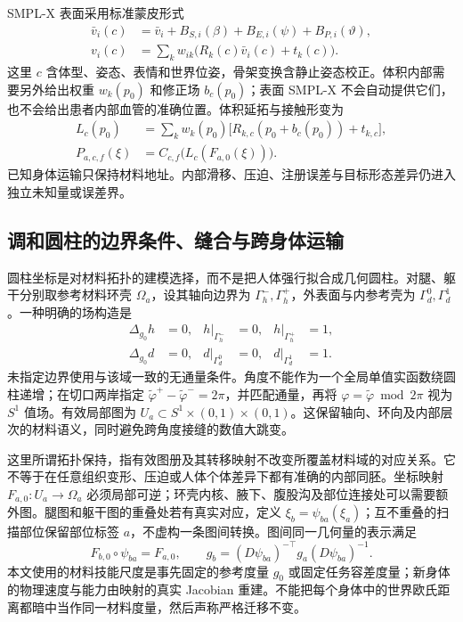 \documentclass[11pt,a4paper]{article}
\numberwithin{equation}{section}
\theoremstyle{definition}
\begin{document}
SMPL-X 表面采用标准蒙皮形式\cite{pavlakos2019}
\begin{align}
 \bar v_i(c)&=\bar v_i+B_{S,i}(\beta)+B_{E,i}(\psi)+B_{P,i}(\vartheta),\\
 v_i(c)&=\sum_k w_{ik}\bigl(R_k(c)\bar v_i(c)+t_k(c)\bigr).
\end{align}
这里 $c$ 含体型、姿态、表情和世界位姿，骨架变换含静止姿态校正。体积内部需要另外给出权重 $w_k(p_0)$ 和修正场 $b_c(p_0)$；表面 SMPL-X 不会自动提供它们，也不会给出患者内部血管的准确位置。体积延拓与接触形变为
\begin{align}
 L_c(p_0)&=\sum_k w_k(p_0)\bigl[R_{k,c}(p_0+b_c(p_0))+t_{k,c}\bigr],\\
 P_{a,c,f}(\xi)&=C_{c,f}\bigl(L_c(F_{a,0}(\xi))\bigr).
\end{align}
已知身体运输只保持材料地址。内部滑移、压迫、注册误差与目标形态差异仍进入独立未知量或误差界。

\subsection{调和圆柱的边界条件、缝合与跨身体运输}
\label{sec:v43:harmonic-detail}
圆柱坐标是对材料拓扑的建模选择，而不是把人体强行拟合成几何圆柱。对腿、躯干分别取参考材料环壳 $\Omega_a$，设其轴向边界为 $\Gamma_h^-,\Gamma_h^+$，外表面与内参考壳为 $\Gamma_d^0,\Gamma_d^1$。一种明确的场构造是
\begin{align}
 \Delta_{g_0}h&=0,& h|_{\Gamma_h^-}&=0,&h|_{\Gamma_h^+}&=1,\\
 \Delta_{g_0}d&=0,& d|_{\Gamma_d^0}&=0,&d|_{\Gamma_d^1}&=1.
\end{align}
未指定边界使用与该域一致的无通量条件。角度不能作为一个全局单值实函数绕圆柱递增；在切口两岸指定 $\widetilde\varphi^+-\widetilde\varphi^-=2\pi$，并匹配通量，再将 $\varphi=\widetilde\varphi\bmod 2\pi$ 视为 $S^1$ 值场。有效局部图为 $U_a\subset S^1\times(0,1)\times(0,1)$。这保留轴向、环向及内部层次的材料语义，同时避免跨角度接缝的数值大跳变。

这里所谓拓扑保持，指有效图册及其转移映射不改变所覆盖材料域的对应关系。它不等于在任意组织变形、压迫或人体个体差异下都有准确的内部同胚。坐标映射 $F_{a,0}:U_a\to\Omega_a$ 必须局部可逆；环壳内核、腋下、腹股沟及部位连接处可以需要额外图。腿图和躯干图的重叠处若有真实对应，定义 $\xi_b=\psi_{ba}(\xi_a)$；互不重叠的扫描部位保留部位标签 $a$，不虚构一条图间转换。图间同一几何量的表示满足
\begin{equation}
 F_{b,0}\circ\psi_{ba}=F_{a,0},\qquad
 g_b=(D\psi_{ba})^{-\top}g_a(D\psi_{ba})^{-1}.
\end{equation}
本文使用的材料技能尺度是事先固定的参考度量 $g_0$ 或固定任务容差度量；新身体的物理速度与能力由映射的真实 Jacobian 重建。不能把每个身体中的世界欧氏距离都暗中当作同一材料度量，然后声称严格迁移不变。
\end{document}
